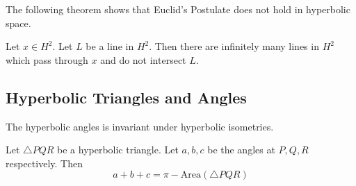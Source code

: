 The following theorem shows that Euclid's Postulate does not hold in hyperbolic space. 

\begin{thm}{}{} Let $x\in H^2$. Let $L$ be a line in $H^2$. Then there are infinitely many lines in $H^2$ which pass through $x$ and do not intersect $L$. 
\end{thm}

\subsection{Hyperbolic Triangles and Angles}
\begin{prp}{}{} The hyperbolic angles is invariant under hyperbolic isometries. 
\end{prp}

\begin{prp}{}{} Let $\triangle PQR$ be a hyperbolic triangle. Let $a,b,c$ be the angles at $P,Q,R$ respectively. Then $$a+b+c=\pi-\text{Area}(\triangle PQR)$$
\end{prp}

